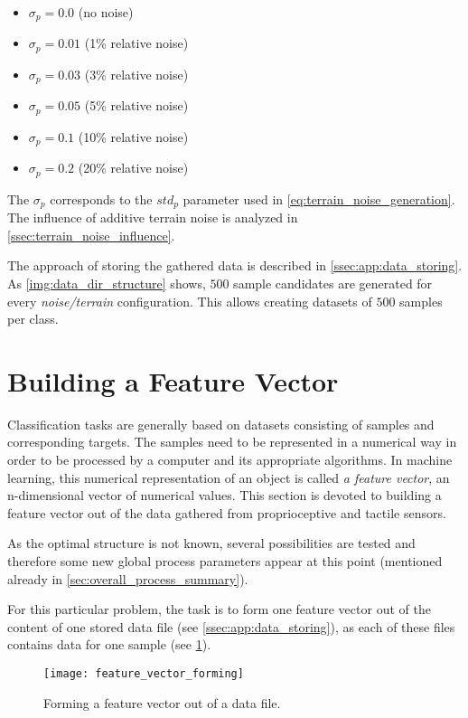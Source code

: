 \begin{itemize}
\item $ \sigma_p = 0.0 $ (no noise)
\item $ \sigma_p = 0.01 $ (1\% relative noise)
\item $ \sigma_p = 0.03 $ (3\% relative noise)
\item $ \sigma_p = 0.05 $ (5\% relative noise)
\item $ \sigma_p = 0.1 $ (10\% relative noise)
\item $ \sigma_p = 0.2 $ (20\% relative noise)
\end{itemize}

The $ \sigma_p $ corresponds to the $ std_p $ parameter used in \cref{eq:terrain_noise_generation}. The influence of additive terrain noise is analyzed in \cref{ssec:terrain_noise_influence}.

The approach of storing the gathered data is described in \cref{ssec:app:data_storing}. As \cref{img:data_dir_structure} shows, $ 500 $ sample candidates are generated for every \textit{noise/terrain} configuration. This allows creating datasets of $ 500 $ samples per class.

\section{Building a Feature Vector} \label{sec:feature_vector_compilation}
Classification tasks are generally based on datasets consisting of samples and corresponding targets. The samples need to be represented in a numerical way in order to be processed by a computer and its appropriate algorithms. In machine learning, this numerical representation of an object is called \textit{a feature vector}, an n-dimensional vector of numerical values. This section is devoted to building a feature vector out of the data gathered from proprioceptive and tactile sensors.

As the optimal structure is not known, several possibilities are tested and therefore some new global process parameters appear at this point (mentioned already in \cref{sec:overall_process_summary}).

For this particular problem, the task is to form one feature vector out of the content of one stored data file (see \cref{ssec:app:data_storing}), as each of these files contains data for one sample (see \cref{img:feature_vector_forming}).

\begin{figure}[H]
  \centering
  \texttt{[image: feature\_vector\_forming]}
  \caption{Forming a feature vector out of a data file.}
  \label{img:feature_vector_forming}
\end{figure}

